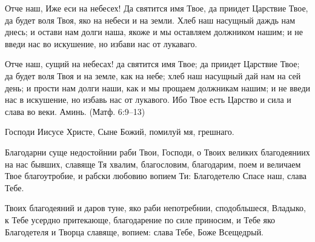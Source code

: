 

\label{_content_molitvi}

\begin{mymulticols}



Отче наш, Иже еси на небесех! Да святится имя Твое, да приидет Царствие Твое, да будет воля Твоя, яко на небеси и на земли. Хлеб наш насущный даждь нам днесь; и остави нам долги наша, якоже и мы оставляем должником нашим; и не введи нас во искушение, но избави нас от лукаваго.

Отче наш, сущий на небесах! да святится имя Твое; да приидет Царствие Твое; да будет воля Твоя и на земле, как на небе; хлеб наш насущный дай нам на сей день; и прости нам долги наши, как и мы прощаем должникам нашим; и не введи нас в искушение, но избавь нас от лукавого. Ибо Твое есть Царство и сила и слава во веки. Аминь. (Матф. 6:9--13)


\end{mymulticols}

\mychapterending




{\centering Господи Иисусе Христе, Сыне Божий, помилуй мя, грешнаго.\par}

\mychapterending


\begin{mymulticols}



Благодарни суще недостойнии раби Твои, Господи, о Твоих великих благодеяниих на нас бывших, славяще Тя хвалим, благословим, благодарим, поем и величаем Твое благоутробие, и рабски любовию вопием Ти: Благодетелю Спасе наш, слава Тебе.


Твоих благодеяний и даров туне, яко раби непотребнии, сподобльшеся, Владыко, к Тебе усердно притекающе, благодарение по силе приносим, и Тебе яко Благодетеля и Творца славяще, вопием: слава Тебе, Боже Всещедрый.

\slavainynen


\end{mymulticols}

